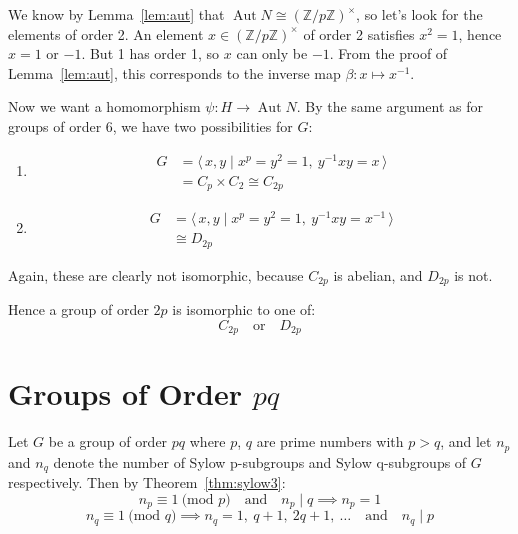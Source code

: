 \documentclass[a4paper, oneside, 12pt, final]{article}
\theoremstyle{definition}
\DeclareMathOperator{\Aut}{Aut}
\newcommand{\Z}{\mathbb{Z}}
\newcommand{\Zn}[1]{\Z/#1\Z}
\newcommand{\units}[1]{(\Zn{#1})^\times}
\begin{document}
We know by Lemma~\ref{lem:aut} that \(\Aut{N} \cong \units{p}\), so let's look for the elements of
order 2.
An element \(x \in \units{p}\) of order 2 satisfies \(x^2 = 1\), hence \(x = 1\) or \(-1\).
But 1 has order 1, so \(x\) can only be \(-1\).
From the proof of Lemma~\ref{lem:aut}, this corresponds to the inverse map \(\beta:x \mapsto
x^{-1}\).

Now we want a homomorphism \(\psi: H \to \Aut{N}\).
By the same argument as for groups of order 6, we have two possibilities for \(G\):

\begin{enumerate}
    \item
        \begin{equation*}
        \begin{aligned}
            G &= \langle\, x, y \mid x^p = y^2 = 1,\ y^{-1}xy = x \,\rangle \\
            &= C_p \times C_2 \cong C_{2p}
        \end{aligned}
        \end{equation*}
    \item
        \begin{equation*}
        \begin{aligned}
            G &= \langle\, x, y \mid x^p = y^2 = 1,\ y^{-1}xy = x^{-1}
            \,\rangle \\
            &\cong D_{2p}
        \end{aligned}
        \end{equation*}
\end{enumerate}

Again, these are clearly not isomorphic, because \(C_{2p}\) is abelian, and \(D_{2p}\) is not.

Hence a group of order \(2p\) is isomorphic to one of:
\[C_{2p} \quad \text{or} \quad D_{2p}\]

\section{Groups of Order \(pq\)}
Let \(G\) be a group of order \(pq\) where \(p\), \(q\) are prime numbers with \(p > q\), and let \(n_p\) and \(n_q\)
denote the number of Sylow p-subgroups and Sylow q-subgroups of \(G\) respectively.
Then by Theorem~\ref{thm:sylow3}:
\[n_p \equiv 1 \ \text{(mod \(p\))} \quad \text{and} \quad n_p \mid q \implies n_p = 1\]
\[n_q \equiv 1 \ \text{(mod \(q\))} \implies n_q = 1,\ q+1,\ 2q+1,\ \dots \quad \text{and} \quad n_q \mid p\]
\end{document}
